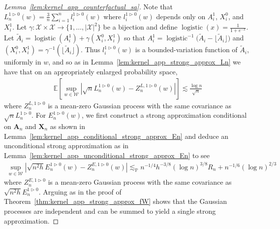 \documentclass[11pt,lof]{puthesis}
\renewcommand{\P}{\ensuremath{\mathbb{P}}}
\newcommand{\E}{\ensuremath{\mathbb{E}}}
\newcommand{\bX}{\ensuremath{\mathbf{X}}}
\newcommand{\bA}{\ensuremath{\mathbf{A}}}
\newcommand{\cX}{\ensuremath{\mathcal{X}}}
\newcommand{\cW}{\ensuremath{\mathcal{W}}}
\DeclareMathOperator*{\logistic}{logistic}
\theoremstyle{break}
\theoremstyle{proof}
\newtheorem{proof}{Proof}
\begin{document}
\begin{proof}[Lemma~\ref{lem:kernel_app_counterfactual_sa}]

  Note that
  $L_n^{1 \triangleright 0}(w)
  = \frac 3n \sum_{i=1}^n l_i^{1 \triangleright 0}(w)$
  where $l_i^{1 \triangleright 0}(w)$ depends only on
  $A_i^1$, $X_i^0$, and $X_i^1$.
  Let $\gamma: \cX \times \cX \to \{1, \ldots, |\cX|^2\}$
  be a bijection and
  define $\logistic(x) = \frac{1}{1+e^{-x}}$.
  Let
  $\tilde A_i = \logistic(A_i^1) + \gamma(X_i^0, X_i^1)$
  so that
  $A_i^1 = \logistic^{-1}\big(\tilde A_i
  - \lfloor \tilde A_i \rfloor\big)$
  and
  $(X_i^0, X_i^1) = \gamma^{-1}(\lfloor \tilde A_i \rfloor)$.
  Thus
  $l_i^{1 \triangleright 0}(w)$ is a bounded-variation function
  of $\tilde A_i$, uniformly in $w$, and so as in
  Lemma~\ref{lem:kernel_app_strong_approx_Ln} we have that
  on an appropriately enlarged probability space,
  \begin{align*}
    \E\left[
      \sup_{w \in \cW}
      \left|
        \sqrt n L_n^{1 \triangleright 0}(w)
        - Z_n^{L, 1 \triangleright 0}(w)
      \right|
    \right]
    \lesssim
    \frac{\log n}{\sqrt n}
  \end{align*}
  where $Z_n^{L, 1 \triangleright 0}$ is a mean-zero
  Gaussian process with the same covariance as
  $\sqrt n L_n^{1 \triangleright 0}$.
  For $E_n^{1 \triangleright 0}(w)$,
  we first construct a strong approximation conditional on
  $\bA_n$ and $\bX_n$ as shown in
  Lemma~\ref{lem:kernel_app_conditional_strong_approx_En}
  and deduce an unconditional strong approximation as in
  Lemma~\ref{lem:kernel_app_unconditional_strong_approx_En} to see
  \begin{align*}
    \sup_{w \in \cW}
    \left|
      \sqrt{n^2h} E_n^{1 \triangleright 0}(w)
      - Z_n^{E, 1 \triangleright 0}(w)
    \right|
    \lesssim_\P
    n^{-1/4} h^{-3/8} (\log n)^{3/8} R_n
    + n^{-1/6} (\log n)^{2/3}
  \end{align*}
  where $Z_n^{E, 1 \triangleright 0}$ is a mean-zero
  Gaussian process with the same covariance as
  $\sqrt{n^2h} E_n^{1 \triangleright 0}$.
  Arguing as in the proof of Theorem~\ref{thm:kernel_app_strong_approx_fW}
  shows that the Gaussian processes are independent
  and can be summed to yield a single strong approximation.
\end{proof}
\end{document}
